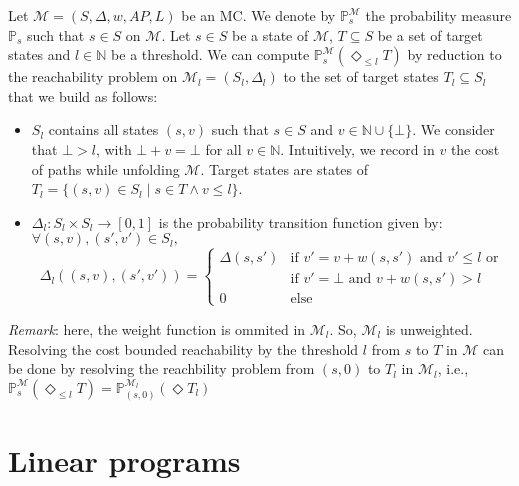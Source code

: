 Let $\mathcal{M} = (S, \Delta, w, AP, L)$ be an MC. We denote by $\mathbb{P}^\mathcal{M}_s$ the probability measure $\mathbb{P}_s$ such that $s \in S$ on $\mathcal{M}$.
Let $s \in S$ be a state of $\mathcal{M}$, $T \subseteq S$ be a set of target states and $l \in \mathbb{N}$ be a threshold.
We can compute $\mathbb{P}^{\mathcal{M}}_s(\Diamond_{\leq l} T)$ by reduction to the reachability problem on $\mathcal{M}_l = (S_l, \Delta_l)$ to the set of target states $T_l \subseteq S_l$ that we build as follows:
\begin{itemize}
	\item $S_l$ contains all states $(s, v)$ such that $s \in S $ and $v \in \mathbb{N} \cup \{ \bot \}$. We consider that $\bot > l$, with $\bot + v = \bot$ for all $v \in \mathbb{N}$. Intuitively, we record in $v$ the cost of paths while unfolding $\mathcal{M}$. Target states are states of $T_l = \{ (s, v) \in S_l \; | \; s \in T \wedge v \leq l \}$.
	\item $\Delta_l: S_l \times S_l \rightarrow [0,1]$ is the probability transition function given by:\\
	$\forall (s, v), (s', v') \in S_l,$
	\[
		\Delta_l((s, v), (s', v')) =
		\begin{cases}
		\Delta(s, s') & \text{if $v' = v + w(s, s')$ and $v' \leq l$  or} \\
		 & \text{if $v' = \bot$ and $v + w(s, s') > l$} \\
		 0 & \text{else}
		\end{cases}
	\]
\end{itemize}
\textit{Remark}: here, the weight function is ommited in $\mathcal{M}_l$. So, $\mathcal{M}_l$ is unweighted. \\
Resolving the cost bounded reachability by the threshold $l$ from $s$ to $T$ in $\mathcal{M}$ can be done by resolving the reachbility problem from $(s, 0)$ to $T_l$ in $\mathcal{M}_l$, i.e., $\mathbb{P}^\mathcal{M}_s(\Diamond_{\leq l} T) = \mathbb{P}^{\mathcal{M}_l}_{(s, 0)}(\Diamond T_l)$

\section{Linear programs}\label{LP-app}
